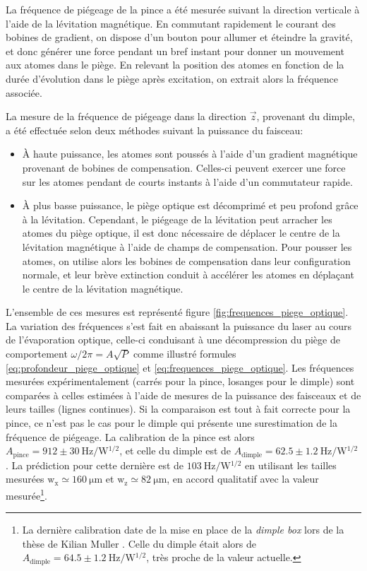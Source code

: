 La fréquence de piégeage de la pince a été mesurée suivant la direction verticale à l'aide de la lévitation magnétique. En commutant rapidement le courant des bobines de gradient, on dispose d'un bouton pour allumer et éteindre la gravité, et donc générer une force pendant un bref instant pour donner un mouvement aux atomes dans le piège. En relevant la position des atomes en fonction de la durée d'évolution dans le piège après excitation, on extrait alors la fréquence associée.

La mesure de la fréquence de piégeage dans la direction $\vec{z}$, provenant du dimple, a été effectuée selon deux méthodes suivant la puissance du faisceau:
\begin{itemize}
\item[\textendash] À haute puissance, les atomes sont poussés à l'aide d'un gradient magnétique provenant de bobines de compensation. Celles-ci peuvent exercer une force sur les atomes pendant de courts instants à l'aide d'un commutateur rapide.
\item[\textendash] À plus basse puissance, le piège optique est décomprimé et peu profond grâce à la lévitation. Cependant, le piégeage de la lévitation peut arracher les atomes du piège optique, il est donc nécessaire de déplacer le centre de la lévitation magnétique à l'aide de champs de compensation. Pour pousser les atomes, on utilise alors les bobines de compensation dans leur configuration normale, et leur brève extinction conduit à accélérer les atomes en déplaçant le centre de la lévitation magnétique.
\end{itemize}

L'ensemble de ces mesures est représenté figure \ref{fig:frequences_piege_optique}. La variation des fréquences s'est fait en abaissant la puissance du laser au cours de l'évaporation optique, celle-ci conduisant à une décompression du piège de comportement $\omega /2\pi =A \sqrt{P}$ comme illustré formules \ref{eq:profondeur_piege_optique} et \ref{eq:frequences_piege_optique}. Les fréquences mesurées expérimentalement (carrés pour la pince, losanges pour le dimple) sont comparées à celles estimées à l'aide de mesures de la puissance des faisceaux et de leurs tailles (lignes continues). Si la comparaison est tout à fait correcte pour la pince, ce n'est pas le cas pour le dimple qui présente une surestimation de la fréquence de piégeage. La calibration de la pince est alors $A_{\mathrm{pince}}=912\pm \SI{30}{\hertz\per\watt^{1/2}}$, et celle du dimple est de $A_{\mathrm{dimple}}=62.5\pm \SI{1.2}{\hertz\per\watt^{1/2}}$ . La prédiction pour cette dernière est de $\SI{103}{\hertz\per\watt^{1/2}}$ en utilisant les tailles mesurées $\mathrm{w}_{\mathrm{x}} \simeq \SI{160}{\micro\metre}$ et $\mathrm{w}_{\mathrm{z}} \simeq \SI{82}{\micro\metre}$, en accord qualitatif avec la valeur mesurée\footnote{La dernière calibration date de la mise en place de la \emph{dimple box} lors de la thèse de Kilian Muller \citep{muller2015coherent}. Celle du dimple était alors de $A_{\mathrm{dimple}}=64.5\pm \SI{1.2}{\hertz\per\watt^{1/2}}$, très proche de la valeur actuelle.}. 

